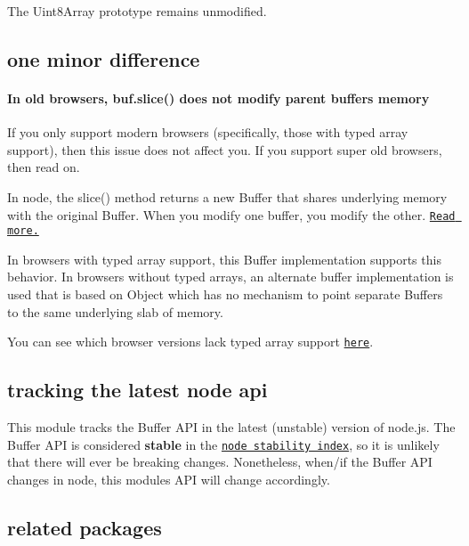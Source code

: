 The {\ttfamily Uint8\+Array} prototype remains unmodified.

\subsection*{one minor difference}

\paragraph*{In old browsers, {\ttfamily buf.\+slice()} does not modify parent buffer\textquotesingle{}s memory}

If you only support modern browsers (specifically, those with typed array support), then this issue does not affect you. If you support super old browsers, then read on.

In node, the {\ttfamily slice()} method returns a new {\ttfamily Buffer} that shares underlying memory with the original Buffer. When you modify one buffer, you modify the other. \href{https://nodejs.org/api/buffer.html#buffer_buf_slice_start_end}{\tt Read more.}

In browsers with typed array support, this {\ttfamily Buffer} implementation supports this behavior. In browsers without typed arrays, an alternate buffer implementation is used that is based on {\ttfamily Object} which has no mechanism to point separate {\ttfamily Buffer}s to the same underlying slab of memory.

You can see which browser versions lack typed array support \href{https://github.com/feross/buffer/blob/master/index.js#L22-L48}{\tt here}.

\subsection*{tracking the latest node api}

This module tracks the Buffer A\+PI in the latest (unstable) version of node.\+js. The Buffer A\+PI is considered {\bfseries stable} in the \href{https://nodejs.org/docs/latest/api/documentation.html#documentation_stability_index}{\tt node stability index}, so it is unlikely that there will ever be breaking changes. Nonetheless, when/if the Buffer A\+PI changes in node, this module\textquotesingle{}s A\+PI will change accordingly.

\subsection*{related packages}


